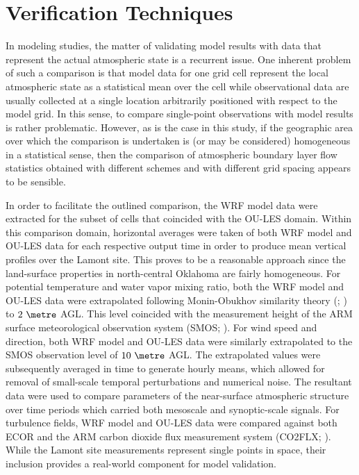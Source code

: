 \section{Verification Techniques}
\label{vt-42}

In modeling studies, the matter of validating model results with data that represent the actual atmospheric state is a recurrent issue. One inherent problem of such a comparison is that model data for one grid cell represent the local atmospheric state as a statistical mean over the cell while observational data are usually collected at a single location arbitrarily positioned with respect to the model grid. In this sense, to compare single-point observations with model results is rather problematic. However, as is the case in this study, if the geographic area over which the comparison is undertaken is (or may be considered) homogeneous in a statistical sense, then the comparison of atmospheric boundary layer flow statistics obtained with different schemes and with different grid spacing appears to be sensible.

In order to facilitate the outlined comparison, the WRF model data were extracted for the subset of cells that coincided with the OU-LES domain. Within this comparison domain, horizontal averages were taken of both WRF model and OU-LES data for each respective output time in order to produce mean vertical profiles over the Lamont site. This proves to be a reasonable approach since the land-surface properties in north-central Oklahoma are fairly homogeneous. For potential temperature and water vapor mixing ratio, both the WRF model and OU-LES data were extrapolated following Monin-Obukhov similarity theory (\citealt{MO}; \citealt{Dyer}) to $2  \mbox { }\metre$ AGL. This level coincided with the measurement height of the ARM surface meteorological observation system (SMOS; \citealt{armSMOS}). For wind speed and direction, both WRF model and OU-LES data were similarly extrapolated to the SMOS observation level of $10 \mbox{ }\metre$ AGL. The extrapolated values were subsequently averaged in time to generate hourly means, which allowed for removal of small-scale temporal perturbations and numerical noise. The resultant data were used to compare parameters of the near-surface atmospheric structure over time periods which carried both mesoscale and synoptic-scale signals. For turbulence fields, WRF model and OU-LES data were compared against both ECOR and the ARM carbon dioxide flux measurement system (CO2FLX; \citealt{armCO2FLUX}). While the Lamont site measurements represent single points in space, their inclusion provides a real-world component for model validation. 

